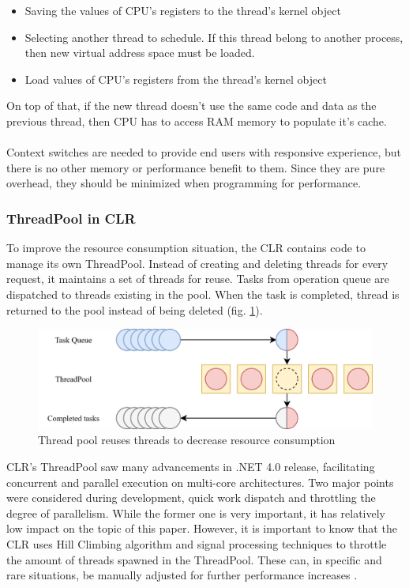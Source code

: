 \begin{itemize}
	\item Saving the values of CPU's registers to the thread's kernel object
	\item Selecting another thread to schedule. If this thread belong to another process, then new virtual address space must be loaded.
	\item Load values of CPU's registers from the thread's kernel object
\end{itemize}

On top of that, if the new thread doesn't use the same code and data as the previous thread, then CPU has to access RAM memory to populate it's cache.
\\ \\ 
Context switches are needed to provide end users with responsive experience, but there is no other memory or performance benefit to them. Since they are pure overhead, they should be minimized when programming for performance. \cite{Richter2012Overhead}
   
\subsubsection{ThreadPool in CLR} 
To improve the resource consumption situation, the CLR contains code to manage its own ThreadPool. Instead of creating and deleting threads for every request, it maintains a set of threads for reuse. Tasks from operation queue are dispatched to threads existing in the pool. When the task is completed, thread is returned to the pool instead of being deleted (fig. \ref{fig:threadpool}).

\begin{figure}[htb]
	\centering
		\includegraphics[scale=1.0]{figures02/threadpool.png}
		\caption{Thread pool reuses threads to decrease resource consumption}
		\label{fig:threadpool}
\end{figure}


CLR's ThreadPool saw many advancements in .NET 4.0 release, facilitating concurrent and parallel execution on multi-core architectures. Two major points were considered during development, quick work dispatch and throttling the degree of parallelism. While the former one is very important, it has relatively low impact on the topic of this paper. 
However, it is important to know that the CLR uses Hill Climbing algorithm and signal processing techniques to throttle the amount of threads spawned in the ThreadPool. These can, in specific and rare situations, be manually adjusted for further performance increases \cite{Fuentes2010}.


